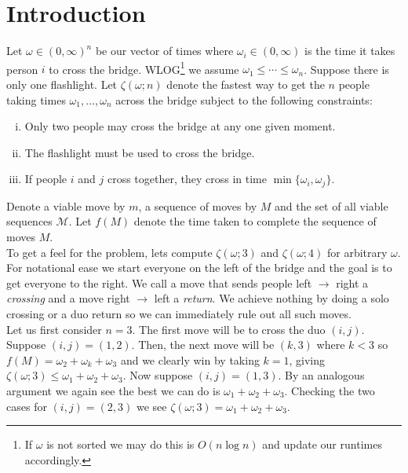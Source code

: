 \documentclass[11pt]{article}
\theoremstyle{definition}
\begin{document}
\section{Introduction}

Let $\omega \in (0, \infty)^n$ be our vector of times where $\omega_i \in (0, \infty)$ is the time it takes person 
$i$ to cross the bridge. WLOG\footnote{
    If $\omega$ is not sorted we may do this is $O(n \log n)$ and update our runtimes accordingly. 
} we assume $\omega_1 \leq \cdots \leq \omega_n$. Suppose there is only one flashlight. Let $\zeta(\omega; n)$ denote 
the fastest way to get the $n$ people taking times $\omega_1, \dots, \omega_n$ across the bridge subject to the 
following constraints: 

\begin{enumerate}[(i)]
 \item Only two people may cross the bridge at any one given moment. 
 \item The flashlight must be used to cross the bridge.
 \item If people $i$ and $j$ cross together, they cross in time $\min\{\omega_i, \omega_j\}$. 
\end{enumerate}

Denote a viable move by $m$, a sequence of moves by $M$ and the set of all viable sequences $\mathcal{M}$. Let 
$f(M)$ denote the time taken to complete the sequence of moves $M$. \\ 

To get a feel for the problem, lets compute $\zeta(\omega ; 3)$ and $\zeta(\omega ; 4)$ for arbitrary $\omega$. For 
notational ease we start everyone on the left of the bridge and the goal is to get everyone to the right. We call a 
move that sends people left $\to$ right a {\it crossing} and a move right $\to$ left a {\it return}. We achieve nothing 
by doing a solo crossing or a duo return so we can immediately rule out all such moves. \\ 

Let us first consider $n = 3$. The first move will be to cross the duo $(i, j)$. Suppose $(i, j) = (1, 2)$. Then, the 
next move will be $(k, 3)$ where $k < 3$ so $f(M) = \omega_2 + \omega_k + \omega_3$ and we clearly win by taking 
$k = 1$, giving $\zeta(\omega ; 3) \leq \omega_1 + \omega_2 + \omega_3$. Now suppose $(i, j) = (1, 3)$. By an 
analogous argument we again see the best we can do is $\omega_1 + \omega_2 + \omega_3$. Checking the two cases for 
$(i, j) = (2, 3)$ we see $\zeta(\omega ; 3) = \omega_1 + \omega_2 + \omega_3$. \\ 
\end{document}
